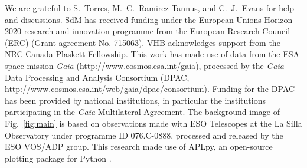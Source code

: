 \documentclass[a4paper,fleqn,usenatbib]{mnras}
\DeclareRobustCommand{\Figref}[1]{Fig.~\ref{#1}}
\begin{document}
\small
We are grateful to S.~Torres, M.~C.~Ramirez-Tannus,
and C.~J.~Evans for help and discussions. SdM has received funding under the European Unions Horizon 2020 research and innovation programme from the European Research Council (ERC) (Grant agreement No. 715063). VHB acknowledges support from the NRC-Canada Plaskett Fellowship. This work has made use of data from the ESA space mission \emph{Gaia} (\url{http://www.cosmos.esa.int/gaia}), processed by the \emph{Gaia} Data Processing and Analysis Consortium (DPAC, \url{http://www.cosmos.esa.int/web/gaia/dpac/consortium}). Funding for the DPAC has been provided by national institutions, in particular the institutions participating in the \emph{Gaia} Multilateral Agreement. The background image of \Figref{fig:main} is based on observations
made with ESO Telescopes at the La Silla Observatory under programme
ID 076.C-0888, processed and released by the ESO VOS/ADP group.
This research made use of APLpy, an open-source plotting package for Python \citep[][]{robitaille:12}.






\bsp	%
\label{lastpage}
\end{document}
